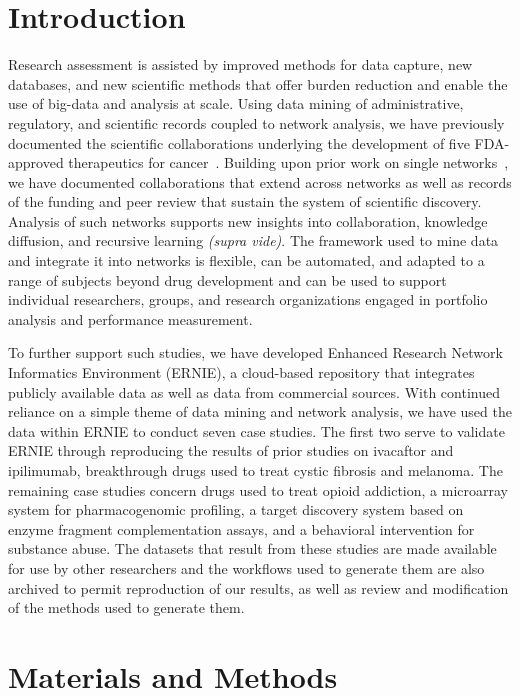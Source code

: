 \documentclass[review]{elsarticle}
\begin{document}
\linenumbers
\raggedright

\section*{Introduction} 

Research assessment is assisted by improved methods for data capture, new databases, and new scientific methods that offer burden reduction and enable the use of big-data and analysis at scale. Using data mining of administrative, regulatory, and scientific records coupled to network analysis, we have previously documented the scientific collaborations underlying the development of five FDA-approved therapeutics for cancer~\cite{Keserci2017}. Building upon prior work on single networks~\cite{Williams2015}, we have documented collaborations that extend across networks as well as records of the funding and peer review that sustain the system of scientific discovery.  Analysis of such networks supports new insights into collaboration, knowledge diffusion, and recursive learning \textit{(supra vide)}. The framework used to mine data and integrate it into networks is flexible, can be automated, and adapted to a range of subjects  beyond drug development and can be used to support individual researchers, groups, and research organizations engaged in portfolio analysis and performance measurement. 

To further support such studies, we have developed Enhanced Research Network Informatics Environment (ERNIE), a cloud-based repository that integrates publicly available data as well as data from commercial sources. With continued reliance on a simple theme of data mining and network analysis, we have used the data within ERNIE to conduct seven case studies. The first two serve to validate ERNIE through reproducing the results of prior studies on ivacaftor and ipilimumab, breakthrough drugs used to treat cystic fibrosis and melanoma. The remaining case studies concern drugs used to treat opioid addiction, a microarray system for pharmacogenomic profiling, a target discovery system based on enzyme fragment complementation assays, and a behavioral intervention for substance abuse. The datasets that result from these studies are made available for use by other researchers and the workflows used to generate them are also archived to permit reproduction of our results, as well as review and modification of the methods used to generate them.

\section*{Materials and Methods}
\end{document}
